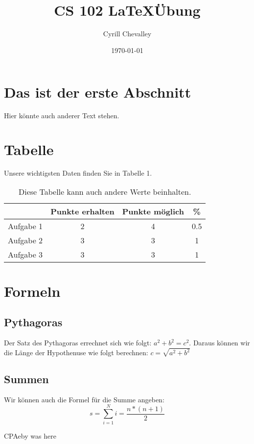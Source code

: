 \documentclass[11pt,a4paper]{article}
\title{CS 102 \LaTeX Übung}
\author{Cyrill Chevalley}
\date{\today}
\begin{document}
\maketitle

\section{Das ist der erste Abschnitt}
Hier könnte auch anderer Text stehen.

\section{Tabelle}
Unsere wichtigsten Daten finden Sie in Tabelle 1.
	\begin{table}[h]
	\begin{centering}
	\begin{tabular}{c|c|c|c}
	&Punkte erhalten&Punkte möglich& \% \\
	\hline
	Aufgabe 1&2&4&0.5 \\
	Aufgabe 2&3&3&1 \\
	Aufgabe 3&3&3&1 \\
	\end{tabular}
	\caption{Diese Tabelle kann auch andere Werte beinhalten.}
	\end{centering}
	\end{table}
	
\section{Formeln}
\subsection{Pythagoras}
Der Satz des Pythagoras errechnet sich wie folgt: $a^{2} + b^2 = c^2$.
Daraus können wir die Länge der Hypothenuse wie folgt berechnen: 
$c = \sqrt{a^2 + b^2} $

\subsection{Summen}	
Wir können auch die Formel für die Summe angeben:
\begin{equation}
s=\sum \limits_{i=1}^{N} i = \frac{n \ast (n+1)}{2}
\end{equation}

CPAeby was here
\end{document}
